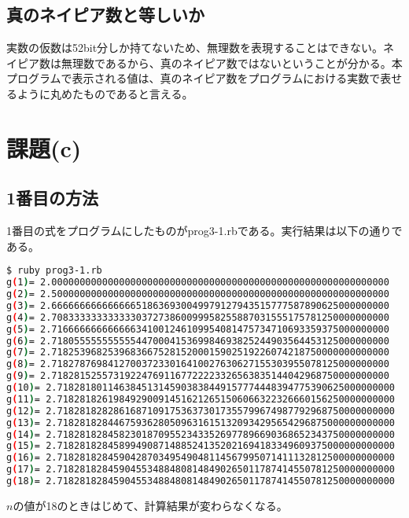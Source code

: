 \documentclass{jsarticle}
\begin{document}
\subsection{真のネイピア数と等しいか}

実数の仮数は52bit分しか持てないため、無理数を表現することはできない。ネイピア数は無理数であるから、真のネイピア数ではないということが分かる。本プログラムで表示される値は、真のネイピア数をプログラムにおける実数で表せるように丸めたものであると言える。

\section{課題(c)}

\subsection{1番目の方法}

1番目の式をプログラムにしたものがprog3-1.rbである。実行結果は以下の通りである。

\begin{lstlisting}[language=sh]
$ ruby prog3-1.rb
g(1)= 2.000000000000000000000000000000000000000000000000000000000000
g(2)= 2.500000000000000000000000000000000000000000000000000000000000
g(3)= 2.666666666666666518636930049979127943515777587890625000000000
g(4)= 2.708333333333333037273860099958255887031555175781250000000000
g(5)= 2.716666666666666341001246109954081475734710693359375000000000
g(6)= 2.718055555555555447000415369984693825244903564453125000000000
g(7)= 2.718253968253968366752815200015902519226074218750000000000000
g(8)= 2.718278769841270037233016410027630627155303955078125000000000
g(9)= 2.718281525573192247691167722223326563835144042968750000000000
g(10)= 2.718281801146384513145903838449157774448394775390625000000000
g(11)= 2.718281826198492900914516212651506066322326660156250000000000
g(12)= 2.718281828286168710917536373017355799674987792968750000000000
g(13)= 2.718281828446759362805096316151320934295654296875000000000000
g(14)= 2.718281828458230187095523433526977896690368652343750000000000
g(15)= 2.718281828458994908714885241352021694183349609375000000000000
g(16)= 2.718281828459042870349549048114567995071411132812500000000000
g(17)= 2.718281828459045534884808148490265011787414550781250000000000
g(18)= 2.718281828459045534884808148490265011787414550781250000000000
\end{lstlisting}

$n$の値が18のときはじめて、計算結果が変わらなくなる。
\end{document}
